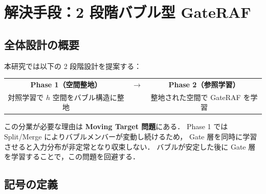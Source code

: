 \documentclass[12pt, a4paper]{ltjsarticle}
\begin{document}
\section{解決手段：2 段階バブル型 GateRAF}

\subsection{全体設計の概要}

本研究では以下の 2 段階設計を提案する：

\begin{center}
\begin{tabular}{ccc}
  \textbf{Phase 1（空間整地）} & $\longrightarrow$ & \textbf{Phase 2（参照学習）} \\[4pt]
  対照学習で $h$ 空間をバブル構造に整地 & & 整地された空間で GateRAF を学習
\end{tabular}
\end{center}

\noindent
この分業が必要な理由は \textbf{Moving Target 問題}にある．
Phase 1 では Split/Merge によりバブルメンバーが変動し続けるため，
Gate 層を同時に学習させると入力分布が非定常となり収束しない．
バブルが安定した後に Gate 層を学習することで，この問題を回避する．

\subsection{記号の定義}
\end{document}
